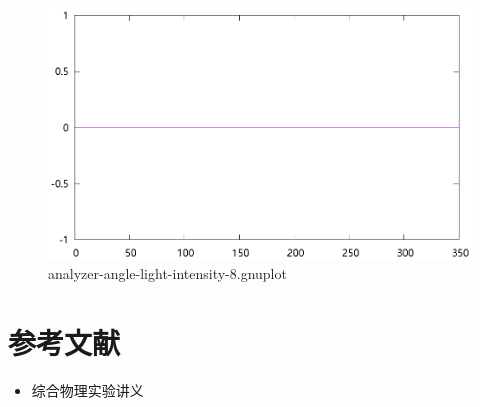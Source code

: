 \documentclass{ctexart}
\begin{document}
    \begin{figure}[H]
      \centering
      \includegraphics[width=\linewidth]{../output/analyzer-angle-light-intensity-8.gnuplot}
      \caption{analyzer-angle-light-intensity-8.gnuplot}
      \label{fig:analyzer-angle-light-intensity-8.gnuplot}
    \end{figure}
    \section{参考文献}
    \begin{itemize}[leftmargin=0pt]
        \item[] 综合物理实验讲义
    \end{itemize}
\end{document}
